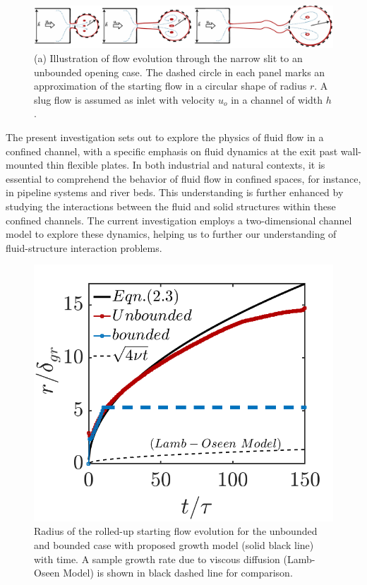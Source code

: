 \documentclass[final,3p,times,authoryear]{elsarticle}
\begin{document}
		\begin{figure}[h]
		\centering
		\begin{minipage}[c]{1\linewidth}	
			\includegraphics[width=1\linewidth]{Figures/VortexPair/model_100_200_400_3.png}
		\end{minipage}
		
		\caption{(a) Illustration of flow evolution through the narrow slit to an unbounded opening case. The dashed circle in each panel marks an approximation of the starting flow in a circular shape of radius $r$. A slug flow is assumed as inlet with velocity $u_o$ in a channel of width $h$.}
		\label{fig:model}
	\end{figure}

The present investigation sets out to explore the physics of fluid flow in a confined channel, with a specific emphasis on fluid dynamics at the exit past wall-mounted thin flexible plates. In both industrial and natural contexts, it is essential to comprehend the behavior of fluid flow in confined spaces, for instance, in pipeline systems and river beds. This understanding is further enhanced by studying the interactions between the fluid and solid structures within these confined channels. The current investigation employs a two-dimensional channel model to explore these dynamics, helping us to further our understanding of fluid-structure interaction problems.
\begin{figure}[h]
	\centering
	\begin{minipage}[c]{0.58\linewidth}
		\centering
		\includegraphics[width=1\linewidth] {Figures/radius_model2.png} 
	\end{minipage}
	\caption{Radius of the rolled-up starting flow evolution for the unbounded and bounded case with proposed growth model (solid black line) with time. A sample growth rate due to viscous diffusion (Lamb-Oseen Model) is shown in black dashed line for comparison.}
	\label{fig:model}
\end{figure}
\end{document}
